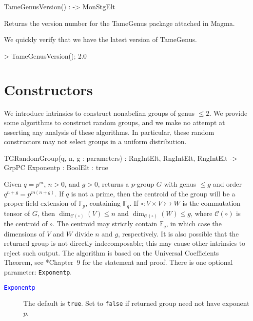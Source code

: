 \documentclass{documentation}
\begin{document}
\begin{intrinsics}
TameGenusVersion() : -> MonStgElt
\end{intrinsics}

Returns the version number for the \textsf{TameGenus} package attached in Magma.

\begin{example}[Version]
    We quickly verify that we have the latest version of \textsf{TameGenus}. 
\begin{code}
> TameGenusVersion();
2.0    
\end{code}
\end{example}


\chapter{Constructors}

We introduce intrinsics to construct nonabelian groups of genus $\leq 2$. 
We provide some algorithms to construct random groups, and we make no attempt at asserting any analysis of these algorithms.
In particular, these random constructors may not select groups in a uniform distribution. 

\begin{intrinsics}
TGRandomGroup(q, n, g : parameters) : RngIntElt, RngIntElt, RngIntElt -> GrpPC
    Exponentp : BoolElt : true
\end{intrinsics}

Given $q=p^m$, $n>0$, and $g>0$, returns a $p$-group $G$ with genus $\leq g$ and order $q^{n+g}=p^{m(n+g)}$. 
If $q$ is not a prime, then the centroid of the group will be a proper field extension of $\mathbb{F}_p$, containing $\mathbb{F}_q$. 
If $\circ: V\times V\rightarrowtail W$ is the commutation tensor of $G$, then $\dim_{\mathcal{C}(\circ)}(V)\leq n$ and $\dim_{\mathcal{C}(\circ)}(W)\leq g$, where $\mathcal{C}(\circ)$ is the centroid of $\circ$. The centroid may strictly contain $\mathbb{F}_q$, in which case the dimensions of $V$ and $W$ divide $n$ and $g$, respectively. It is also possible that the returned group is not directly indecomposable; this may cause other intrinsics to reject such output. 
The algorithm is based on the Universal Coefficients Theorem, see \cite{LGM:book}*{Chapter~9} for the statement and proof.
There is one optional parameter: \texttt{Exponentp}. 

\begin{description}
\item[\textcolor{blue}{\tt Exponentp}]
The default is \texttt{true}.
Set to \texttt{false} if returned group need not have exponent $p$.  
\end{description}
\end{document}
